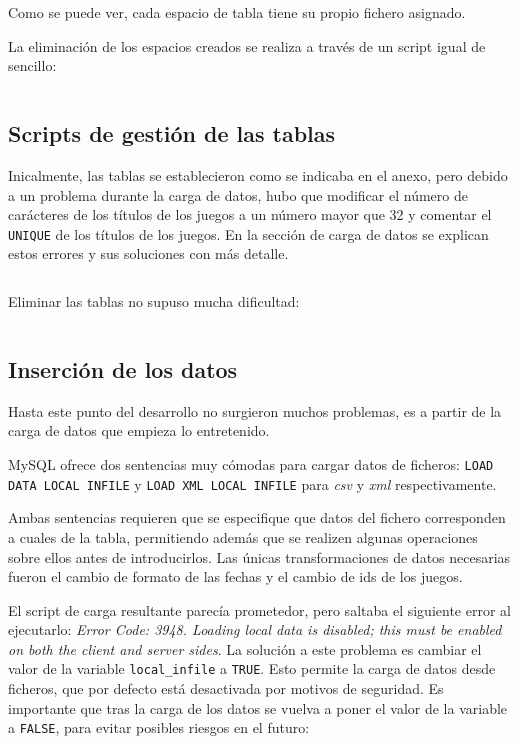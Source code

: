 \documentclass[a4paper, 11pt, oneside]{article} %
\newcommand{\scriptdir}{../scripts/} %
\begin{document}
Como se puede ver, cada espacio de tabla tiene su propio fichero asignado.

La eliminación de los espacios creados se realiza a través de un script igual de sencillo:

\inputminted{mysql}{\scriptdir drop_physical.sql}




\subsection{Scripts de gestión de las tablas}

Inicalmente, las tablas se establecieron como se indicaba en el anexo, pero debido a un problema durante la carga de datos, hubo que modificar el número de carácteres de los títulos de los juegos a un número mayor que 32 y comentar el \texttt{UNIQUE} de los títulos de los juegos. En la sección de carga de datos se explican estos errores y sus soluciones con más detalle.

\inputminted{mysql}{\scriptdir set_tables.sql}

Eliminar las tablas no supuso mucha dificultad:

\inputminted{mysql}{\scriptdir drop_tables.sql}




\subsection{Inserción de los datos}

Hasta este punto del desarrollo no surgieron muchos problemas, es a partir de la carga de datos que empieza lo entretenido.

MySQL ofrece dos sentencias muy cómodas para cargar datos de ficheros: \texttt{LOAD DATA LOCAL INFILE} y \texttt{LOAD XML LOCAL INFILE} para \emph{csv} y \emph{xml} respectivamente.

Ambas sentencias requieren que se especifique que datos del fichero corresponden a cuales de la tabla, permitiendo además que se realizen algunas operaciones sobre ellos antes de introducirlos. Las únicas transformaciones de datos necesarias fueron el cambio de formato de las fechas y el cambio de ids de los juegos.

El script de carga resultante parecía prometedor, pero saltaba el siguiente error al ejecutarlo: \emph{Error Code: 3948. Loading local data is disabled; this must be enabled on both the client and server sides}. La solución a este problema es cambiar el valor de la variable \texttt{local_infile} a \texttt{TRUE}. Esto permite la carga de datos desde ficheros, que por defecto está desactivada por motivos de seguridad. Es importante que tras la carga de los datos se vuelva a poner el valor de la variable a \texttt{FALSE}, para evitar posibles riesgos en el futuro:
\end{document}
